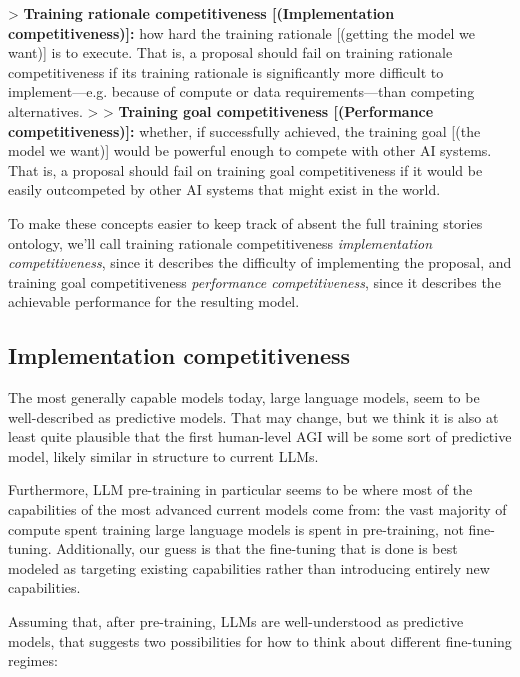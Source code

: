 {> \textbf{Training rationale competitiveness [(Implementation competitiveness)]:} how hard the training rationale [(getting the model we want)] is to execute. That is, a proposal should fail on training rationale competitiveness if its training rationale is significantly more difficult to implement---e.g. because of compute or data requirements---than competing alternatives.
>
> \textbf{Training goal competitiveness [(Performance competitiveness)]:} whether, if successfully achieved, the training goal [(the model we want)] would be powerful enough to compete with other AI systems. That is, a proposal should fail on training goal competitiveness if it would be easily outcompeted by other AI systems that might exist in the world.

To make these concepts easier to keep track of absent the full training stories ontology\cite{TODO: cite https://www.alignmentforum.org/posts/FDJnZt8Ks2djouQTZ/how-do-we-become-confident-in-the-safety-of-a-machine}, we'll call training rationale competitiveness \textit{implementation competitiveness}, since it describes the difficulty of implementing the proposal, and training goal competitiveness \textit{performance competitiveness}, since it describes the achievable performance for the resulting model.


\subsection{Implementation competitiveness}

The most generally capable models today, large language models, seem to be well-described as predictive models. That may change, but we think it is also at least quite plausible that the first human-level AGI will be some sort of predictive model, likely similar in structure to current LLMs.

Furthermore, LLM pre-training in particular seems to be where most of the capabilities of the most advanced current models come from: the vast majority of compute spent training large language models is spent in pre-training, not fine-tuning. Additionally, our guess is that the fine-tuning that is done is best modeled as targeting existing capabilities rather than introducing entirely new capabilities.

Assuming that, after pre-training, LLMs are well-understood as predictive models, that suggests two possibilities for how to think about different fine-tuning regimes:



}
